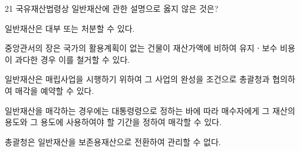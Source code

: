 \begin{question}{21}
국유재산법령상 일반재산에 관한 설명으로 옳지 않은 것은?
\begin{choices}
  \item 일반재산은 대부 또는 처분할 수 있다.
  \item 중앙관서의 장은 국가의 활용계획이 없는 건물이 재산가액에 비하여 유지ㆍ보수 비용이 과다한 경우 이를 철거할 수 있다.
  \item 일반재산은 매립사업을 시행하기 위하여 그 사업의 완성을 조건으로 총괄청과 협의하여 매각을 예약할 수 있다.
  \item 일반재산을 매각하는 경우에는 대통령령으로 정하는 바에 따라 매수자에게 그 재산의 용도와 그 용도에 사용하여야 할 기간을 정하여 매각할 수 있다.
  \item 총괄청은 일반재산을 보존용재산으로 전환하여 관리할 수 없다.
\end{choices}
\end{question}
